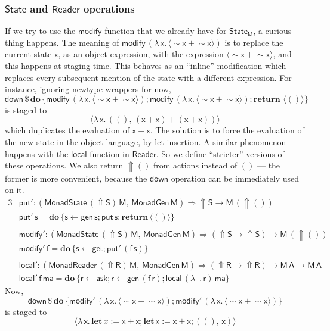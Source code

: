 \documentclass[acmsmall,screen,review,anonymous]{acmart}
\newcommand{\mit}[1]{{\mathsf{#1}}}
\newcommand{\msf}[1]{{\mathsf{#1}}}
\newcommand{\mbf}[1]{{\mathbf{#1}}}
\newcommand{\bs}[1]{\boldsymbol{#1}}
\newcommand{\mdo}{\mbf{do}\,}
\newcommand{\return}{\mbf{return}\,}
\newcommand{\lam}{\lambda\,}
\newcommand{\M}{\msf{M}}
\newcommand{\letdef}{\mbf{let\,}}
\newcommand{\vma}{\mathsf{ma}}
\newcommand{\vA}{\mathsf{A}}
\newcommand{\vS}{\mathsf{S}}
\newcommand{\vR}{\mathsf{R}}
\newcommand{\vM}{\mathsf{M}}
\newcommand{\vx}{\mathsf{x}}
\newcommand{\vf}{\mathsf{f}}
\newcommand{\vs}{\mathsf{s}}
\newcommand{\vr}{\mathsf{r}}
\newcommand{\Reader}{\msf{Reader}}
\newcommand{\fro}{\leftarrow}
\newcommand{\Up}{{\Uparrow}}
\newcommand{\spl}{{\bs{\sim}}}
\newcommand{\ql}{{\bs{\langle}}}
\newcommand{\qr}{{\bs{\rangle}}}
\theoremstyle{remark}
\newcommand{\mdown}{\mit{down}}
\newcommand{\gen}{\mit{gen}}
\newcommand{\qt}[1]{\ql#1\qr}
\newcommand{\MonadGen}{\msf{MonadGen}}
\newcommand{\MonadState}{\msf{MonadState}}
\newcommand{\MonadReader}{\msf{MonadReader}}
\newcommand{\RA}{\Rightarrow}
\newcommand{\dlr}{\,\$\,}
\newcommand{\State}{\msf{State}}
\newcommand{\modify}{\mit{modify}}
\newcommand{\get}{\mit{get}}
\newcommand{\mput}{\mit{put}}
\begin{document}
\subsubsection{$\State$ and $\Reader$ operations} If we try to use
the $\modify$ function that we already have for $\State_\M$, a curious thing
happens. The meaning of $\modify\,(\lam \vx.\,\qt{\spl \vx + \spl \vx})$ is to replace
the current state $\vx$, as an object expression, with the expression $\qt{\spl \vx
  + \spl \vx}$, and this happens at staging time. This behaves as an ``inline''
modification which replaces every subsequent mention of the state with a
different expression. For instance, ignoring newtype wrappers for now,
\[ \mdown \dlr \mdo \{\modify\,(\lam \vx.\,\qt{\spl \vx + \spl \vx}); \modify\,(\lam \vx.\,\qt{\spl \vx + \spl \vx});\return\,\qt{()}\} \]
is staged to
\[ \qt{\lam \vx.\,((),\,(\vx + \vx) + (\vx + \vx))} \]
which duplicates the evaluation of $\vx + \vx$. The solution is to force the
evaluation of the new state in the object language, by let-insertion. A similar
phenomenon happens with the $\mit{local}$ function in $\Reader$. So we define
``stricter'' versions of these operations. We also return $\Up ()$ from
actions instead of $()$ --- the former is more convenient, because the $\mdown$
operation can be immediately used on it.
\begingroup
\allowdisplaybreaks
\begin{alignat*}{3}
  & \mput' : (\MonadState\,(\Up \vS)\,\vM,\,\MonadGen\,\vM) \RA \Up \vS \to \vM\,(\Up ()) \\
  & \mput'\,\vs = \mdo \{\vs \fro \gen\,\vs; \mput\,\vs; \return \qt{()}\}\\
  &\\
  & \modify' : (\MonadState\,(\Up \vS)\,\vM,\,\MonadGen\,\vM) \RA (\Up \vS \to \Up \vS) \to \vM\,(\Up ()) \\
  & \modify'\,\vf = \mdo \{\vs \fro \get; \mput'\,(\vf\,\vs)\}\\
  &\\
  & \mit{local'} : (\MonadReader\,(\Up \vR)\,\vM,\,\MonadGen\,\vM) \RA (\Up \vR \to \Up \vR) \to \vM\,\vA \to \vM\,\vA\\
  & \mit{local'}\,\vf\,\vma = \mdo \{\vr \fro \mit{ask}; \vr \fro \gen\,(\vf\,\vr);\mit{local}\,(\lam \_.\,\vr)\,\vma\}
\end{alignat*}
\endgroup
Now,
\[ \mdown \dlr \mdo \{\modify'\,(\lam \vx.\,\qt{\spl \vx + \spl \vx}); \modify'\,(\lam \vx.\,\qt{\spl \vx + \spl \vx})\} \]
is staged to
\[ \qt{\lam \vx.\,\letdef x := \vx + \vx; \letdef \vx := \vx + \vx; ((),\,\vx)} \]
\end{document}
